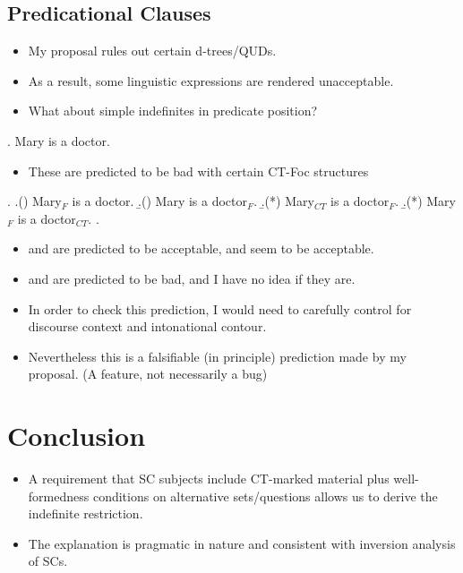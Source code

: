 \documentclass[letterpaper]{article}
\begin{document}
\subsection{Predicational Clauses}
\begin{itemize}
  \item My proposal rules out certain d-trees/QUDs.
  \item As a result, some linguistic expressions are rendered unacceptable.
  \item What about simple indefinites in predicate position?
\end{itemize}
\ex. Mary is a doctor.

\begin{itemize}
  \item These are predicted to be bad with certain CT-Foc structures
\end{itemize}
\ex. 
\a.{()} Mary$_F$ is a doctor.
\b.{()} Mary is a doctor$_F$.
\b.{(*)} Mary$_{CT}$ is a doctor$_F$.
\b.{(*)} Mary$_F$ is a doctor$_{CT}$.
\z.

\begin{itemize}
  \item \Last[a] and \Last[b] are predicted to be acceptable, and seem to be acceptable.
  \item \Last[c] and \Last[d] are predicted to be bad, and I have no idea if they are.
  \item In order to check this prediction, I would need to carefully control for discourse context and intonational contour.
  \item Nevertheless this is a falsifiable (in principle) prediction made by my proposal. (A feature, not necessarily a bug)
\end{itemize}

\section{Conclusion}
\begin{itemize}
  \item A requirement that SC subjects include CT-marked material plus well-formedness conditions on alternative sets/questions allows us to derive the indefinite restriction.
  \item The explanation is pragmatic in nature and consistent with  inversion analysis of SCs.
\end{itemize}
\printbibliography
\end{document}
